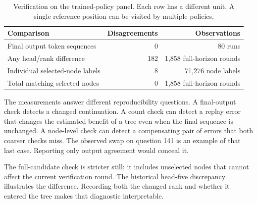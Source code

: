 \begin{table}[ht]\centering
\caption{Verification on the trained-policy panel. Each row has a different unit. A single reference position can be visited by multiple policies.}
\begin{tabular}{lrr}\toprule
Comparison & Disagreements & Observations\\\midrule
Final output token sequences & 0 & 80 runs\\
Any head/rank difference & 182 & 1,858 full-horizon rounds\\
Individual selected-node labels & 8 & 71,276 node labels\\
Total matching selected nodes & 0 & 1,858 full-horizon rounds\\\bottomrule
\end{tabular}
\end{table}

The measurements answer different reproducibility questions. A final-output check detects a changed continuation. A count check can detect a replay error that changes the estimated benefit of a tree even when the final sequence is unchanged. A node-level check can detect a compensating pair of errors that both coarser checks miss. The observed swap on question 141 is an example of that last case. Reporting only output agreement would conceal it.

The full-candidate check is stricter still: it includes unselected nodes that cannot affect the current verification round. The historical head-five discrepancy illustrates the difference. Recording both the changed rank and whether it entered the tree makes that diagnostic interpretable.
